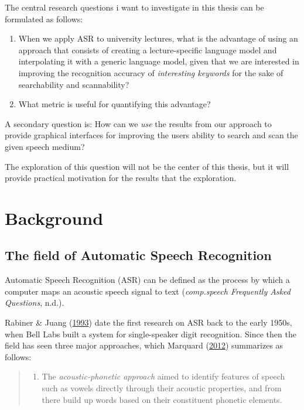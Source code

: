 \documentclass[]{article}
\providecommand{\tightlist}{%
  \setlength{\itemsep}{0pt}\setlength{\parskip}{0pt}}
\begin{document}
The central research questions i want to investigate in this thesis can
be formulated as follows:

\begin{enumerate}
\def\labelenumi{(\arabic{enumi})}
\item
  When we apply ASR to university lectures, what is the advantage of
  using an approach that consists of creating a lecture-specific
  language model and interpolating it with a generic language model,
  given that we are interested in improving the recognition accuracy of
  \emph{interesting keywords} for the sake of searchability and
  scannability?
\item
  What metric is useful for quantifying this advantage?
\end{enumerate}

A secondary question is: How can we \emph{use} the results from our
approach to provide graphical interfaces for improving the users ability
to search and scan the given speech medium?

The exploration of this question will not be the center of this thesis,
but it will provide practical motivation for the results that the
exploration.

\section{Background}\label{background}

\subsection{The field of Automatic Speech
Recognition}\label{the-field-of-automatic-speech-recognition}

Automatic Speech Recognition (ASR) can be defined as the process by
which a computer maps an acoustic speech signal to text
(\emph{comp.speech Frequently Asked Questions}, n.d.).

Rabiner \& Juang (\hyperref[ref-rabiner]{1993}) date the first research
on ASR back to the early 1950s, when Bell Labs built a system for
single-speaker digit recognition. Since then the field has seen three
major approaches, which Marquard (\hyperref[ref-marquard]{2012})
summarizes as follows:

\begin{quote}
\begin{enumerate}
\def\labelenumi{\arabic{enumi}.}
\tightlist
\item
  The \emph{acoustic-phonetic approach} aimed to identify features of
  speech such as vowels directly through their acoustic properties, and
  from there build up words based on their constituent phonetic
  elements.
\end{enumerate}
\end{quote}
\end{document}

